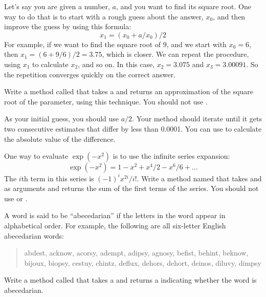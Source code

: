 \begin{exercise}  %

Let's say you are given a number, $a$, and you want to find its square root.
One way to do that is to start with a rough guess about the answer, $x_0$, and then improve the guess by using this formula:
%
\[ x_1 =(x_0 + a/x_0) / 2 \]
%
For example, if we want to find the square root of 9, and we start with $x_0 = 6$, then $x_1 = (6 + 9/6) / 2 = 3.75$, which is closer.
We can repeat the procedure, using $x_1$ to calculate $x_2$, and so on.
In this case, $x_2 = 3.075$ and $x_3 = 3.00091$.
So the repetition converges quickly on the correct answer.

Write a method called  that takes a  and returns an approximation of the square root of the parameter, using this technique.
You should not use .

As your initial guess, you should use $a/2$.
Your method should iterate until it gets two consecutive estimates that differ by less than 0.0001.
You can use  to calculate the absolute value of the difference.

\end{exercise}


\begin{exercise}  %

One way to evaluate $\exp(-x^2)$ is to use the infinite series expansion:
%
\[ \exp(-x^2) = 1 - x^2 + x^4/2 - x^6/6 + \ldots \]
%
The $i$th term in this series is $(-1)^i x^{2i} / i!$.
Write a method named  that takes  and  as arguments and returns the sum of the first  terms of the series.
You should not use  or .

\end{exercise}


\begin{exercise}  %


A word is said to be ``abecedarian'' if the letters in the word appear in alphabetical order.
For example, the following are all six-letter English abecedarian words:

\begin{quote}
abdest, acknow, acorsy, adempt, adipsy, agnosy, befist, behint, %
beknow, bijoux, biopsy, cestuy, chintz, deflux, dehors, dehort, %
deinos, diluvy, dimpsy %
\end{quote}

Write a method called  that takes a  and returns a  indicating whether the word is abecedarian.

\end{exercise}


